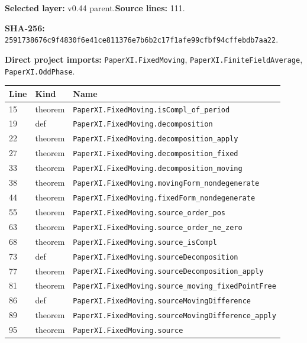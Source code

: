 \documentclass[10pt,oneside]{book}
\begin{document}
\textbf{Selected layer:} v0.44 parent.\quad\textbf{Source lines:} 111.\par\textbf{SHA-256:} {\scriptsize\nolinkurl{2591738676c9f4830f6e41ce811376e7b6b2c17f1afe99cfbf94cffebdb7aa22}}.


\textbf{Direct project imports:} \nolinkurl{PaperXI.FixedMoving}, \nolinkurl{PaperXI.FiniteFieldAverage}, \nolinkurl{PaperXI.OddPhase}.

\begin{longtable}{@{}p{}p{}p{}@{}}\toprule Line&Kind&Name\\\midrule\endhead

15&theorem&\nolinkurl{PaperXI.FixedMoving.isCompl_of_period}\\

19&def&\nolinkurl{PaperXI.FixedMoving.decomposition}\\

22&theorem&\nolinkurl{PaperXI.FixedMoving.decomposition_apply}\\

27&theorem&\nolinkurl{PaperXI.FixedMoving.decomposition_fixed}\\

33&theorem&\nolinkurl{PaperXI.FixedMoving.decomposition_moving}\\

38&theorem&\nolinkurl{PaperXI.FixedMoving.movingForm_nondegenerate}\\

44&theorem&\nolinkurl{PaperXI.FixedMoving.fixedForm_nondegenerate}\\

55&theorem&\nolinkurl{PaperXI.FixedMoving.source_order_pos}\\

63&theorem&\nolinkurl{PaperXI.FixedMoving.source_order_ne_zero}\\

68&theorem&\nolinkurl{PaperXI.FixedMoving.source_isCompl}\\

73&def&\nolinkurl{PaperXI.FixedMoving.sourceDecomposition}\\

77&theorem&\nolinkurl{PaperXI.FixedMoving.sourceDecomposition_apply}\\

81&theorem&\nolinkurl{PaperXI.FixedMoving.source_moving_fixedPointFree}\\

86&def&\nolinkurl{PaperXI.FixedMoving.sourceMovingDifference}\\

89&theorem&\nolinkurl{PaperXI.FixedMoving.sourceMovingDifference_apply}\\

95&theorem&\nolinkurl{PaperXI.FixedMoving.source}\\

\bottomrule\end{longtable}
\end{document}

